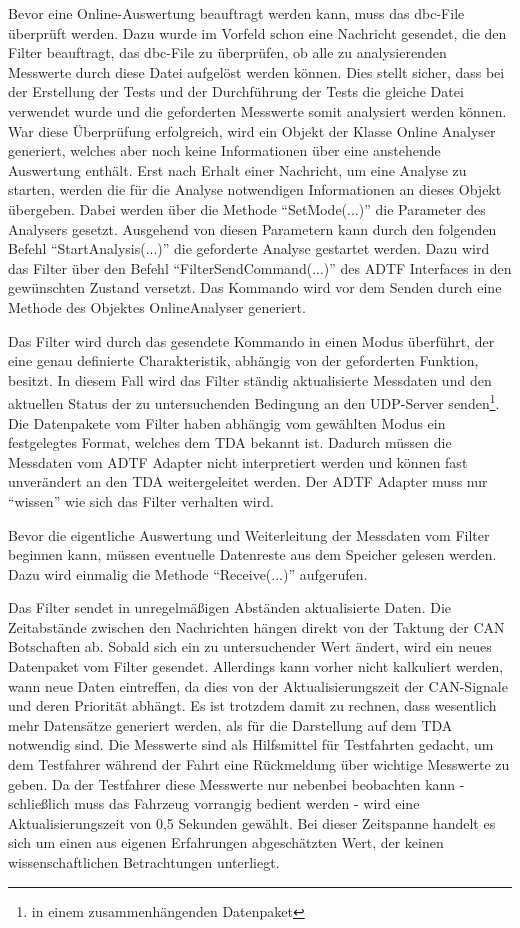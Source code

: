 \documentclass[12pt,a4paper]{report}
\begin{document}
Bevor eine Online-Auswertung beauftragt werden kann, muss das dbc-File überprüft werden. Dazu wurde im Vorfeld schon eine Nachricht gesendet, die den Filter beauftragt, das dbc-File zu überprüfen, ob alle zu analysierenden Messwerte durch diese Datei aufgelöst werden können. Dies stellt sicher, dass bei der Erstellung der Tests und der Durchführung der Tests die gleiche Datei verwendet wurde und die geforderten Messwerte somit analysiert werden können. War diese Überprüfung erfolgreich, wird ein Objekt der Klasse Online Analyser generiert, welches aber noch keine Informationen über eine anstehende Auswertung enthält. Erst nach Erhalt einer Nachricht, um eine Analyse zu starten, werden die für die Analyse notwendigen Informationen an dieses Objekt übergeben. Dabei werden über die Methode "`SetMode(...)"' die Parameter des Analysers gesetzt. Ausgehend von diesen Parametern kann durch den folgenden Befehl "`StartAnalysis(...)"' die geforderte Analyse gestartet werden. Dazu wird das Filter über den Befehl "`FilterSendCommand(...)"' des ADTF Interfaces in den gewünschten Zustand versetzt. Das Kommando wird vor dem Senden durch eine Methode des Objektes OnlineAnalyser generiert. 

Das Filter wird durch das gesendete Kommando in einen Modus überführt, der eine genau definierte Charakteristik, abhängig von der geforderten Funktion, besitzt. In diesem Fall wird das Filter ständig aktualisierte Messdaten und den aktuellen Status der zu untersuchenden Bedingung an den UDP-Server senden\footnote{in einem zusammenhängenden Datenpaket}. Die Datenpakete vom Filter haben abhängig vom gewählten Modus ein festgelegtes Format, welches dem TDA bekannt ist. Dadurch müssen die Messdaten vom ADTF Adapter nicht interpretiert werden und können fast unverändert an den TDA weitergeleitet werden. Der ADTF Adapter muss nur "`wissen"' wie sich das Filter verhalten wird.

Bevor die eigentliche Auswertung und Weiterleitung der Messdaten vom Filter beginnen kann, müssen eventuelle Datenreste aus dem Speicher gelesen werden. Dazu wird einmalig die Methode "`Receive(...)"' aufgerufen.

Das Filter sendet in unregelmä\ss igen Abständen aktualisierte Daten. Die Zeitabstände zwischen den Nachrichten hängen direkt von der Taktung der CAN Botschaften ab. Sobald sich ein zu untersuchender Wert ändert, wird ein neues Datenpaket vom Filter gesendet. Allerdings kann vorher nicht kalkuliert werden, wann neue Daten eintreffen, da dies von der Aktualisierungszeit der CAN-Signale und deren Priorität abhängt. Es ist trotzdem damit zu rechnen, dass wesentlich mehr Datensätze generiert werden, als für die Darstellung auf dem TDA notwendig sind. Die Messwerte sind als Hilfsmittel für Testfahrten gedacht, um dem Testfahrer während der Fahrt eine Rückmeldung über wichtige Messwerte zu geben. Da der Testfahrer diese Messwerte nur nebenbei beobachten kann - schlie\ss lich muss das Fahrzeug vorrangig bedient werden - wird eine Aktualisierungszeit von 0,5 Sekunden gewählt. Bei dieser Zeitspanne handelt es sich um einen aus eigenen Erfahrungen abgeschätzten Wert, der keinen wissenschaftlichen Betrachtungen unterliegt.
\end{document}
